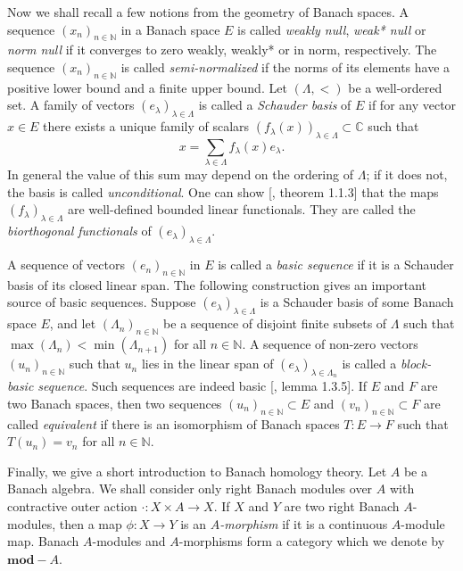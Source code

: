 \documentclass[12pt]{article}
\begin{document}
Now we shall recall a few notions from the geometry of Banach spaces. A 
sequence $(x_n)_{n\in\mathbb{N}}$ in a Banach space $E$ is called 
\textit{weakly null}, \textit{weak* null} or \textit{norm null} if it converges 
to zero weakly, weakly* or in norm, respectively. The 
sequence $(x_n)_{n\in\mathbb{N}}$ is called \textit{semi-normalized} if the norms 
of its elements have a positive lower bound and a finite upper bound. 
Let $(\Lambda, <)$ be a well-ordered set. A family of 
vectors $(e_\lambda)_{\lambda\in\Lambda}$ is called a \textit{Schauder basis} 
of $E$ if for any vector $x\in E$ there exists a unique family of scalars 
$(f_\lambda(x))_{\lambda\in\Lambda}\subset\mathbb{C}$ such that 
\[
    x=\sum_{\lambda\in\Lambda}f_\lambda(x) e_\lambda.
\]
In general the value of this sum may depend on the ordering of $\Lambda$; if it 
does not, the basis is called \textit{unconditional}. One can 
show [\cite{KalAlbTopicsBanSpTh}, theorem 1.1.3] that the 
maps $(f_\lambda)_{\lambda\in\Lambda}$ are well-defined bounded linear 
functionals. They are called the \textit{biorthogonal functionals}
of $(e_\lambda)_{\lambda\in\Lambda}$. 

A sequence of 
vectors $(e_n)_{n\in\mathbb{N}}$ in $E$ is called a \textit{basic sequence} if 
it is a Schauder basis of its closed linear span. The following construction 
gives an important source of basic sequences. 
Suppose $(e_\lambda)_{\lambda\in\Lambda}$ is a Schauder basis of some Banach 
space $E$, and let $(\Lambda_n)_{n\in\mathbb{N}}$ be a sequence of disjoint 
finite subsets of $\Lambda$ such that $\max(\Lambda_n)<\min(\Lambda_{n+1})$ for 
all $n\in\mathbb{N}$. A sequence of non-zero vectors $(u_n)_{n\in\mathbb{N}}$ 
such that $u_n$ lies in the linear span of $(e_\lambda)_{\lambda\in\Lambda_n}$ 
is called a \textit{block-basic sequence}. Such sequences are indeed 
basic [\cite{KalAlbTopicsBanSpTh}, lemma 1.3.5]. If $E$ and $F$ are two 
Banach spaces, then two sequences $(u_n)_{n\in\mathbb{N}}\subset E$ 
and $(v_n)_{n\in\mathbb{N}}\subset F$ are called \textit{equivalent} if there 
is an isomorphism of Banach spaces $T:E\to F$ such that $T(u_n)=v_n$ for 
all $n\in\mathbb{N}$.

Finally, we give a short introduction to Banach homology theory. Let $A$ 
be a Banach algebra. We shall consider only right Banach modules over
$A$ with contractive outer action $\cdot:X\times A\to X$. If $X$ and $Y$ are two
right Banach $A$-modules, then a map $\phi:X\to Y$ is an \textit{$A$-morphism}
if it is a continuous $A$-module map. Banach $A$-modules and $A$-morphisms form
a category which we denote by $\mathbf{mod}-A$.
\end{document}
